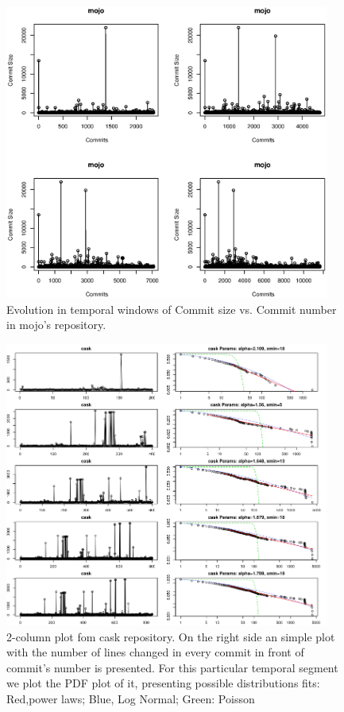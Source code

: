 \documentclass[conference]{IEEEtran}
\begin{document}
\begin{figure}[htbp]
  \centerline{\includegraphics[width=0.95\textwidth]{img/mojo_temporal.eps}}
  \caption{Evolution in temporal windows of Commit size vs. Commit
    number in mojo's repository.}
  \label{fig:mojoev}
\end{figure}

\begin{figure}[htbp]
  \centerline{\includegraphics[width=0.95\textwidth]{img/adjusted_dist_cask.png}}
  \caption{2-column plot fom cask repository. On the right side an
    simple plot with the number of lines changed in every commit in
    front of commit's number is presented. For this particular
    temporal segment we plot the PDF plot of it, presenting possible
    distributions fits: Red,power laws; Blue, Log Normal; Green:
    Poisson}
  \label{fig:cask}
\end{figure}
\end{document}
